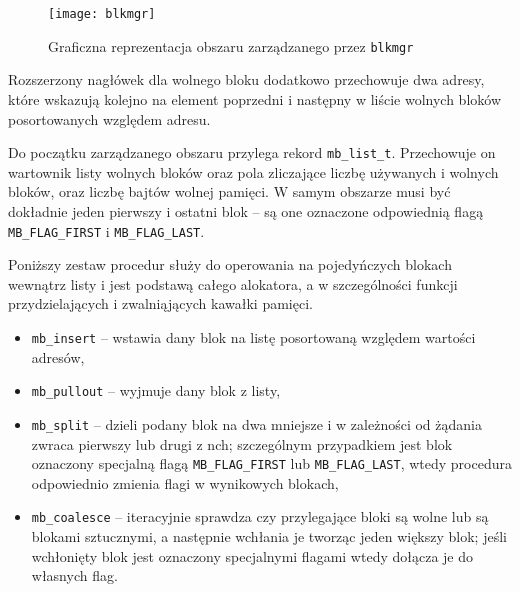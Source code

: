 \documentclass[12pt,a4paper,titlepage,twoside]{mwart}
\begin{document}
\begin{figure}[ht]
\centering
\texttt{[image: blkmgr]}
\caption{Graficzna reprezentacja obszaru zarządzanego przez \texttt{blkmgr}}
\end{figure}

Rozszerzony nagłówek dla wolnego bloku dodatkowo przechowuje dwa adresy, które
wskazują kolejno na element poprzedni i następny w liście wolnych bloków
posortowanych względem adresu.

Do początku zarządzanego obszaru przylega rekord \verb+mb_list_t+. Przechowuje
on wartownik listy wolnych bloków oraz pola zliczające liczbę używanych i
wolnych bloków, oraz liczbę bajtów wolnej pamięci. W samym obszarze musi być
dokładnie jeden pierwszy i ostatni blok -- są one oznaczone odpowiednią flagą
\verb+MB_FLAG_FIRST+ i \verb+MB_FLAG_LAST+.

Poniższy zestaw procedur służy do operowania na pojedyńczych blokach wewnątrz
listy i jest podstawą całego alokatora, a w szczególności funkcji
przydzielających i zwalniąjących kawałki pamięci.
\begin{itemize}
\item \verb+mb_insert+ -- wstawia dany blok na listę posortowaną względem
wartości adresów,
\item \verb+mb_pullout+ -- wyjmuje dany blok z listy,
\item \verb+mb_split+ -- dzieli podany blok na dwa mniejsze i w zależności od
żądania zwraca pierwszy lub drugi z nch; szczególnym przypadkiem jest blok
oznaczony specjalną flagą \verb+MB_FLAG_FIRST+ lub \verb+MB_FLAG_LAST+, wtedy
procedura odpowiednio zmienia flagi w wynikowych blokach,
\item \verb+mb_coalesce+ -- iteracyjnie sprawdza czy przylegające bloki są
wolne lub są blokami sztucznymi, a następnie wchłania je tworząc jeden większy
blok; jeśli wchłonięty blok jest oznaczony specjalnymi flagami wtedy dołącza je
do własnych flag.
\end{itemize}
\end{document}
